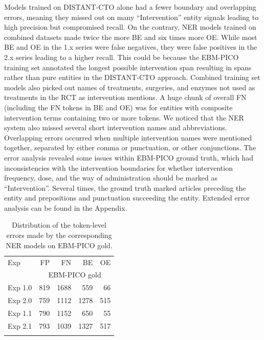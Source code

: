 \documentclass[11pt]{article}
\begin{document}
Models trained on DISTANT-CTO alone had a fewer boundary and overlapping errors, meaning they missed out on many ``Intervention'' entity signals leading to high precision but compromised recall.
On the contrary, NER models trained on combined datasets made twice the more BE and six times more OE.
While most BE and OE in the 1.x series were false negatives, they were false positives in the 2.x series leading to a higher recall.
This could be because the EBM-PICO training set annotated the longest possible intervention span resulting in spans rather than pure entities in the DISTANT-CTO approach.
Combined training set models also picked out names of treatments, surgeries, and enzymes not used as treatments in the RCT as intervention mentions.
A huge chunk of overall FN (including the FN tokens in BE and OE) was for entities with composite intervention terms containing two or more tokens.
We noticed that the NER system also missed several short intervention names and abbreviations.
Overlapping errors occurred when multiple intervention names were mentioned together, separated by either comma or punctuation, or other conjunctions.
The error analysis revealed some issues within EBM-PICO ground truth, which had inconsistencies with the intervention boundaries for whether intervention frequency, dose, and the way of administration should be marked as ``Intervention''.
Several times, the ground truth marked articles preceding the entity and prepositions and punctuation succeeding the entity.
Extended error analysis can be found in the Appendix.
\begin{table}[ht]
\centering
    \begin{tabular}{l|rrrr}
        \Xhline{1pt}
        Exp     & FP & FN & BE & OE\\
         & \multicolumn{4}{c}{EBM-PICO gold} \\
        \Xhline{1pt}
        Exp 1.0 &  819  &  1688  &  559  &  66 \\
        Exp 2.0 &  759  &  1112  &  1278  &  515 \\
        Exp 1.1 &  790  &  1152  &  650  &  55 \\
        Exp 2.1 &  793  &  1039  &  1327 & 517 \\
        \Xhline{1pt}
    \end{tabular}
    \caption{Distribution of the token-level errors made by the corresponding NER models on EBM-PICO gold.}
    \label{tab:error_ner}
\end{table}
\end{document}
